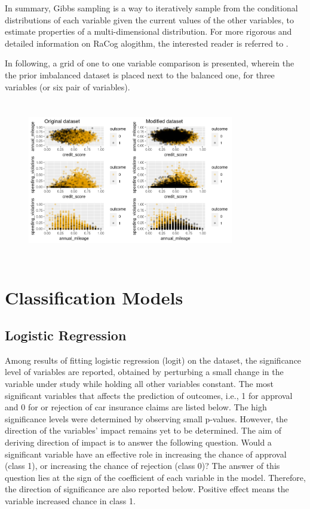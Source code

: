 \documentclass{article}
\begin{document}
In summary, Gibbs sampling is a way to iteratively sample from the
conditional distributions of each variable given the current values of
the other variables, to estimate properties of a multi-dimensional
distribution. For more rigorous and detailed information on RaCog
alogithm, the interested reader is referred to \cite{racog}.

In following, a grid of one to one variable comparison is presented,
wherein the the prior imbalanced dataset is placed next to the balanced
one, for three variables (or six pair of variables).

\begin{figure}[H] 
    \centerline{\includegraphics[width=9cm, height=7cm]{./figures/plotcompare.png}}
\end{figure}

\hypertarget{classification-models}{%
\section{\texorpdfstring{Classification Models
\label{sec:modeling}}{Classification Models }}\label{classification-models}}

\hypertarget{logistic-regression}{%
\subsection{\texorpdfstring{Logistic Regression
\label{subsec:logit}}{Logistic Regression }}\label{logistic-regression}}

Among results of fitting logistic regression (logit) on the dataset, the
significance level of variables are reported, obtained by perturbing a
small change in the variable under study while holding all other
variables constant. The most significant variables that affects the
prediction of outcomes, i.e., 1 for approval and 0 for or rejection of
car insurance claims are listed below. The high significance levels were
determined by observing small p-values. However, the direction of the
variables' impact remains yet to be determined. The aim of deriving
direction of impact is to answer the following question. Would a
significant variable have an effective role in increasing the chance of
approval (class 1), or increasing the chance of rejection (class 0)? The
answer of this question lies at the sign of the coefficient of each
variable in the model. Therefore, the direction of significance are also
reported below. Positive effect means the variable increased chance in
class 1.
\end{document}
